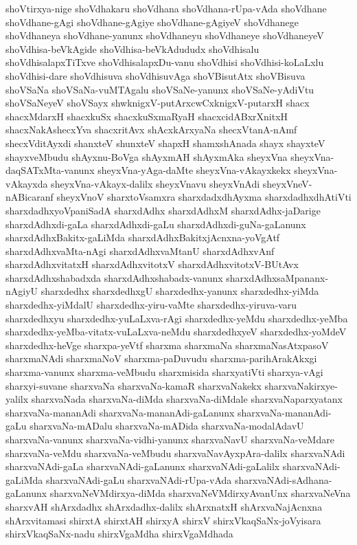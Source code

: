 {shoVtirxya-nige
shoVdhakaru
shoVdhana
shoVdhana-rUpa-vAda
shoVdhane
shoVdhane-gAgi
shoVdhane-gAgiye
shoVdhane-gAgiyeV
shoVdhanege
shoVdhaneya
shoVdhane-yanunx
shoVdhaneyu
shoVdhaneye
shoVdhaneyeV
shoVdhisa-beVkAgide
shoVdhisa-beVkAdududx
shoVdhisalu
shoVdhisalapxTiTxve
shoVdhisalapxDu-vanu
shoVdhisi
shoVdhisi-koLaLxlu
shoVdhisi-dare
shoVdhisuva
shoVdhisuvAga
shoVBisutAtx
shoVBisuva
shoVSaNa
shoVSaNa-vuMTAgalu
shoVSaNe-yanunx
shoVSaNe-yAdiVtu
shoVSaNeyeV
shoVSayx
shwknigxV-putArxcwCxknigxV-putarxH
shacx
shacxMdarxH
shacxkuSx
shacxkuSxmaRyaH
shacxcidABxrXnitxH
shacxNakAshecxYva
shacxritAvx
shAcxkArxyaNa
shecxVtanA-nAmf
shecxVditAyxdi
shanxteV
shunxteV
shapxH
shamxshAnada
shayx
shayxteV
shayxveMbudu
shAyxnu-BoVga
shAyxmAH
shAyxmAka
sheyxVna
sheyxVna-daqSATxMta-vanunx
sheyxVna-yAga-daMte
sheyxVna-vAkayxkekx
sheyxVna-vAkayxda
sheyxVna-vAkayx-dalilx
sheyxVnavu
sheyxVnAdi
sheyxVneV-nABicaranf
sheyxVnoV
sharxtoVsamxra
sharxdadxdhAyxma
sharxdadhxdhAtiVti
sharxdadhxyoVpaniSadA
sharxdAdhx
sharxdAdhxM
sharxdAdhx-jaDarige
sharxdAdhxdi-gaLa
sharxdAdhxdi-gaLu
sharxdAdhxdi-guNa-gaLanunx
sharxdAdhxBakitx-gaLiMda
sharxdAdhxBakitxjAcnxna-yoVgAtf
sharxdAdhxvaMta-nAgi
sharxdAdhxvaMtanU
sharxdAdhxvAnf
sharxdAdhxvitatxH
sharxdAdhxvitotxV
sharxdAdhxvitotxV-BUtAvx
sharxdAdhxshabadxda
sharxdAdhxshabadx-vanunx
sharxdAdhxsaMpananx-nAgiyU
sharxdedhx
sharxdedhxgU
sharxdedhx-yanunx
sharxdedhx-yiMda
sharxdedhx-yiMdalU
sharxdedhx-yiru-vaMte
sharxdedhx-yiruva-varu
sharxdedhxyu
sharxdedhx-yuLaLxva-rAgi
sharxdedhx-yeMdu
sharxdedhx-yeMba
sharxdedhx-yeMba-vitatx-vuLaLxva-neMdu
sharxdedhxyeV
sharxdedhx-yoMdeV
sharxdedhx-heVge
sharxpa-yeVtf
sharxma
sharxmaNa
sharxmaNasAtxpasoV
sharxmaNAdi
sharxmaNoV
sharxma-paDuvudu
sharxma-parihArakAkxgi
sharxma-vanunx
sharxma-veMbudu
sharxmisida
sharxyatiVti
sharxya-vAgi
sharxyi-suvane
sharxvaNa
sharxvaNa-kamaR
sharxvaNakekx
sharxvaNakirxye-yalilx
sharxvaNada
sharxvaNa-diMda
sharxvaNa-diMdale
sharxvaNaparxyatanx
sharxvaNa-mananAdi
sharxvaNa-mananAdi-gaLanunx
sharxvaNa-mananAdi-gaLu
sharxvaNa-mADalu
sharxvaNa-mADida
sharxvaNa-modalAdavU
sharxvaNa-vanunx
sharxvaNa-vidhi-yanunx
sharxvaNavU
sharxvaNa-veMdare
sharxvaNa-veMdu
sharxvaNa-veMbudu
sharxvaNavAyxpAra-dalilx
sharxvaNAdi
sharxvaNAdi-gaLa
sharxvaNAdi-gaLanunx
sharxvaNAdi-gaLalilx
sharxvaNAdi-gaLiMda
sharxvaNAdi-gaLu
sharxvaNAdi-rUpa-vAda
sharxvaNAdi-sAdhana-gaLanunx
sharxvaNeVMdirxya-diMda
sharxvaNeVMdirxyAvanUnx
sharxvaNeVna
sharxvAH
shArxdadhx
shArxdadhx-dalilx
shArxnatxH
shArxvaNajAcnxna
shArxvitamasi
shirxtA
shirxtAH
shirxyA
shirxV
shirxVkaqSaNx-joVyisara
shirxVkaqSaNx-nadu
shirxVgaMdha
shirxVgaMdhada
}
